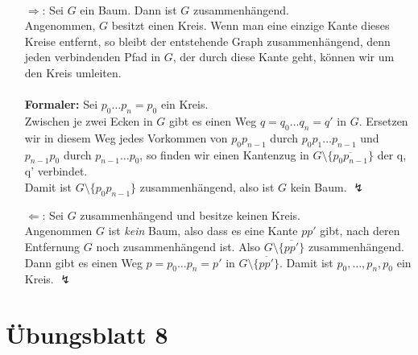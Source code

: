 \begin{solution}
\
  \begin{itemize}
    \item [\( \Rightarrow \):] Sei \( G \) ein Baum. Dann ist \( G \) zusammenhängend. \\
    Angenommen, \( G \) besitzt einen Kreis. Wenn man eine einzige Kante dieses Kreise entfernt, so bleibt der entstehende Graph zusammenhängend, denn jeden verbindenden Pfad in \( G \), der durch diese Kante geht, können wir um den Kreis umleiten. \\ 
    \\
    \textbf{Formaler:} Sei \( p_0 \dots p_n = p_0 \) ein Kreis. \\
    Zwischen je zwei Ecken in \( G \) gibt es einen Weg \( q = q_0 \dots q_n = q' \) in \( G \). Ersetzen wir in diesem Weg jedes Vorkommen von \( p_0p_{n-1} \) durch \( p_0p_1 \dots p_{n-1} \) und \( p_{n-1}p_0 \) durch \( p_{n-1} \dots p_0 \), so finden wir einen Kantenzug in \( G \setminus \{ \overline{p_0p_{n-1}} \} \) der q, q' verbindet. \\
    Damit ist \( G \setminus \{ p_0p_{n-1} \} \) zusammenhängend, also ist \( G \) kein Baum. \quad \( \lightning \)
    
    \item [\( \Leftarrow \):] Sei \( G \) zusammenhängend und besitze keinen Kreis. \\
    Angenommen \( G \) ist \emph{kein} Baum, also dass es eine Kante \( pp' \) gibt, nach deren Entfernung \( G \) noch zusammenhängend ist. Also \( G \setminus \{ \overline{pp'} \} \) zusammenhängend. \\
    Dann gibt es einen Weg \( p = p_0 \dots p_n = p' \) in \( G \setminus \{ \overline{pp'} \} \). Damit ist \( p_0, \dots, p_n, p_0 \) ein Kreis. \quad \( \lightning \)
  \end{itemize}  
\end{solution}

%
\section{Übungsblatt 8}
\setcounter{problemcounter}{0}

